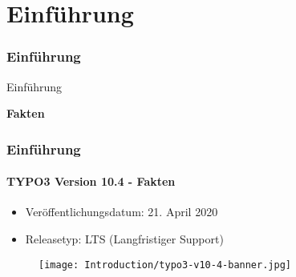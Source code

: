 %

\section{Einführung}
\begin{frame}[fragile]
	\frametitle{Einführung}

	\begin{center}\huge{Einführung}\end{center}
	\begin{center}\huge{\color{typo3darkgrey}\textbf{Fakten}}\end{center}

\end{frame}


\begin{frame}[fragile]
	\frametitle{Einführung}
	\framesubtitle{TYPO3 Version 10.4 - Fakten}

	\begin{itemize}
		\item Veröffentlichungsdatum: 21. April 2020
		\item Releasetyp: LTS (Langfristiger Support)
	\end{itemize}

	\begin{figure}
		\texttt{[image: Introduction/typo3-v10-4-banner.jpg]}
	\end{figure}

\end{frame}


